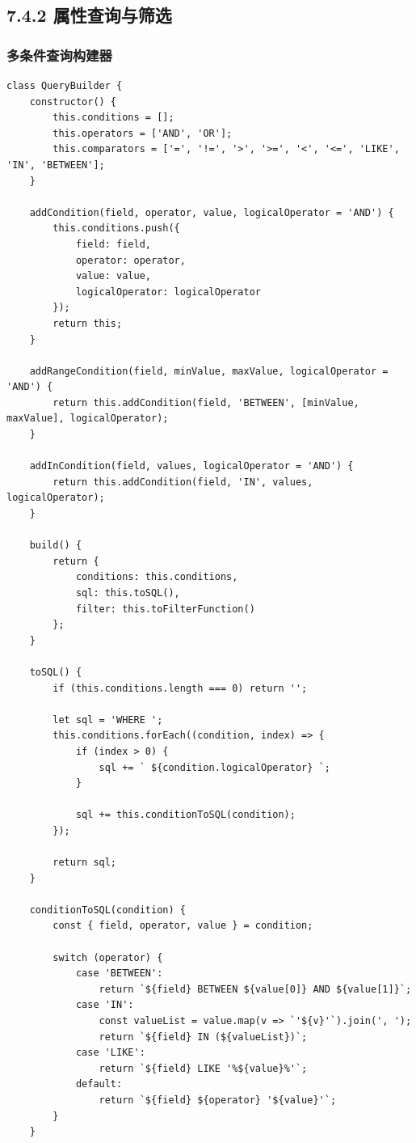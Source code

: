 \subsection{7.4.2
属性查询与筛选}\label{ux5c5eux6027ux67e5ux8be2ux4e0eux7b5bux9009}

\subsubsection{多条件查询构建器}\label{ux591aux6761ux4ef6ux67e5ux8be2ux6784ux5efaux5668}

\begin{lstlisting}
class QueryBuilder {
    constructor() {
        this.conditions = [];
        this.operators = ['AND', 'OR'];
        this.comparators = ['=', '!=', '>', '>=', '<', '<=', 'LIKE', 'IN', 'BETWEEN'];
    }
    
    addCondition(field, operator, value, logicalOperator = 'AND') {
        this.conditions.push({
            field: field,
            operator: operator,
            value: value,
            logicalOperator: logicalOperator
        });
        return this;
    }
    
    addRangeCondition(field, minValue, maxValue, logicalOperator = 'AND') {
        return this.addCondition(field, 'BETWEEN', [minValue, maxValue], logicalOperator);
    }
    
    addInCondition(field, values, logicalOperator = 'AND') {
        return this.addCondition(field, 'IN', values, logicalOperator);
    }
    
    build() {
        return {
            conditions: this.conditions,
            sql: this.toSQL(),
            filter: this.toFilterFunction()
        };
    }
    
    toSQL() {
        if (this.conditions.length === 0) return '';
        
        let sql = 'WHERE ';
        this.conditions.forEach((condition, index) => {
            if (index > 0) {
                sql += ` ${condition.logicalOperator} `;
            }
            
            sql += this.conditionToSQL(condition);
        });
        
        return sql;
    }
    
    conditionToSQL(condition) {
        const { field, operator, value } = condition;
        
        switch (operator) {
            case 'BETWEEN':
                return `${field} BETWEEN ${value[0]} AND ${value[1]}`;
            case 'IN':
                const valueList = value.map(v => `'${v}'`).join(', ');
                return `${field} IN (${valueList})`;
            case 'LIKE':
                return `${field} LIKE '%${value}%'`;
            default:
                return `${field} ${operator} '${value}'`;
        }
    }
    

\end{lstlisting}
